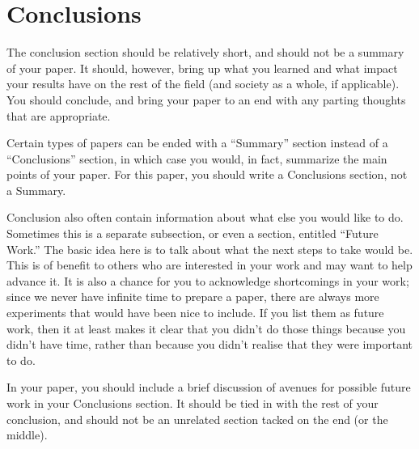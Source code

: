 \documentclass[12pt, letterpaper]{article}
\begin{document}
\section{Conclusions}
The conclusion section should be relatively short, and should not be a summary
of your paper.  It should, however, bring up what you learned and what impact
your results have on the rest of the field (and society as a
whole, if applicable).  You should conclude, and bring your paper to an  end
with any parting thoughts that are appropriate.

Certain types of papers can be ended with a ``Summary'' section instead of a
``Conclusions'' section, in which case you would, in fact, summarize the main
points of your paper.  For this paper, you should write a Conclusions section,
not a Summary.

Conclusion also often contain information about what else you would like
to do.  Sometimes this is a separate subsection, or even a section, entitled
``Future Work.''  The basic idea here is to talk about what the next steps to
take would be.  This is of benefit to others who are interested in your
work and may want to help advance it.  It is also a chance for you to
acknowledge shortcomings in your work; since we never have infinite time to
prepare a paper, there are always more experiments that would have been nice to
include.  If you list them as future work, then it at least makes it clear that
you didn't do those things because you didn't have time, rather than because you
didn't realise that they were important to do.

In your paper, you should include a brief discussion of avenues for possible
future work in your Conclusions section.  It should be tied in with the rest of
your conclusion, and should not be an unrelated section tacked on the end (or
the middle).





\end{document}

